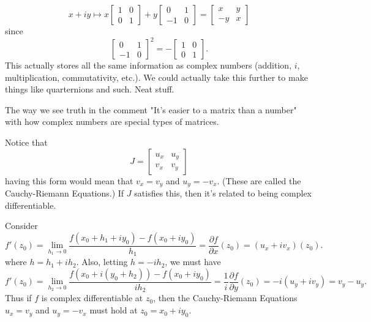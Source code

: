 \documentclass[class=article, crop=false]{standalone}
\begin{document}
\begin{rem}

    \[
      x+iy \mapsto x
        \begin{bmatrix}
          1&0\\
          0&1
        \end{bmatrix}
        + y
          \begin{bmatrix}
            0&1\\
            -1&0
          \end{bmatrix}
        =
          \begin{bmatrix}
            x&y \\
            -y&x
          \end{bmatrix}
    \]
  since
    \[
      \begin{bmatrix}
        0&1\\-1&0
      \end{bmatrix}^2
      =
        -\begin{bmatrix}
          1&0\\0&1
        \end{bmatrix}.
    \]
  This actually stores all the same information as complex numbers (addition, $i$, multiplication, commutativity, etc.). We could actually take this further to make things like quarternions and such. Neat stuff.

  The way we see truth in the comment "It's easier to a matrix than a number" with how complex numbers are special types of matrices.

  Notice that
    \[
      J =
        \begin{bmatrix}
          u_x&u_y\\v_x&v_y
        \end{bmatrix}
    \]
  having this form would mean that $v_x=v_y$ and $u_y=-v_x$. (These are called the Cauchy-Riemann Equations.) If $J$ satisfies this, then it's related to being complex differentiable.
\end{rem}

Consider
  \[
    f'(z_0) = \lim_{h_1 \to 0} \frac{f(x_0+h_1+iy_0)-f(x_0+iy_0)}{h_1} =
      \frac{\partial f}{\partial x}(z_0) = (u_x + iv_x)(z_0).
  \]
 where $h=h_1+ih_2$. Also, letting $h=-ih_2$, we must have
   \[
     f'(z_0) =\lim_{h_2 \to 0} \frac{f(x_0+i(y_0+h_2))-f(x_0+iy_0)}{ih_2} = \frac{1}{i} \frac{\partial f}{\partial y}(z_0) = -i(u_y+iv_y) = v_y-u_y.
   \]
 Thus if $f$ is complex differentiable at $z_0$, then the Cauchy-Riemann Equations $u_x=v_y$ and $u_y=-v_x$ must hold at $z_0 = x_0+iy_0$.
\end{document}
